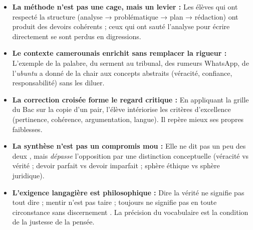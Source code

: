 \documentclass[11pt]{article}
\newcounter{popsec}
\newcounter{popsub}
\newcommand{\courssub}[1]{%
  \stepcounter{popsub}%
  \par\vspace{9pt}\noindent{\popxbold\fontsize{11.5}{13}\selectfont\color{popink}{\color{poporange}\thepopsec.\thepopsub}\hspace{6pt}#1}\par\nopagebreak\vspace{4pt}
}
\begin{document}
\courssub{Bilan de l'activité}
\begin{aretenir}
\begin{itemize}
    \item \textbf{La méthode n'est pas une cage, mais un levier :} Les élèves qui ont respecté la structure (analyse → problématique → plan → rédaction) ont produit des devoirs cohérents ; ceux qui ont \guillemotleft sauté \guillemotright l'analyse pour écrire directement se sont perdus en digressions.
    \item \textbf{Le contexte camerounais enrichit sans remplacer la rigueur :} L'exemple de la palabre, du serment au tribunal, des rumeurs WhatsApp, de l'\emph{ubuntu} a donné de la chair aux concepts abstraits (véracité, confiance, responsabilité) sans les diluer.
    \item \textbf{La correction croisée forme le regard critique :} En appliquant la grille du Bac sur la copie d'un pair, l'élève intériorise les critères d'excellence (pertinence, cohérence, argumentation, langue). Il repère mieux ses propres faiblesses.
    \item \textbf{La synthèse n'est pas un compromis mou :} Elle ne dit pas \guillemotleft un peu des deux \guillemotright, mais \emph{dépasse} l'opposition par une distinction conceptuelle (véracité vs vérité ; devoir parfait vs devoir imparfait ; sphère éthique vs sphère juridique).
    \item \textbf{L'exigence langagière est philosophique :} \guillemotleft Dire la vérité \guillemotright ne signifie pas \guillemotleft tout dire \guillemotright ; \guillemotleft mentir \guillemotright n'est pas \guillemotleft taire \guillemotright ; \guillemotleft toujours \guillemotright ne signifie pas \guillemotleft en toute circonstance sans discernement \guillemotright. La précision du vocabulaire est la condition de la justesse de la pensée.
\end{itemize}
\end{aretenir}
\end{document}
